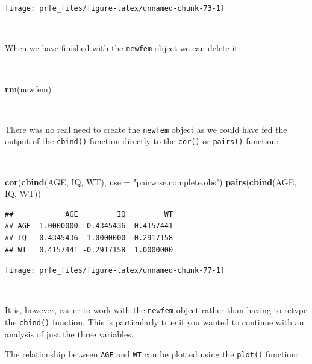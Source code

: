\documentclass[12pt,a4paper]{book}
\newenvironment{Shaded}{\begin{snugshade}}{\end{snugshade}}
\newcommand{\DataTypeTok}[1]{\textcolor[rgb]{0.13,0.29,0.53}{#1}}
\newcommand{\KeywordTok}[1]{\textcolor[rgb]{0.13,0.29,0.53}{\textbf{#1}}}
\newcommand{\NormalTok}[1]{#1}
\newcommand{\StringTok}[1]{\textcolor[rgb]{0.31,0.60,0.02}{#1}}
\theoremstyle{definition}
\theoremstyle{definition}
\theoremstyle{definition}
\theoremstyle{remark}
\begin{document}
\newpage

\begin{center}\texttt{[image: prfe\_files/figure-latex/unnamed-chunk-73-1]} \end{center}

~

When we have finished with the \texttt{newfem} object we can delete it:

~

\begin{Shaded}
\begin{Highlighting}[]
\KeywordTok{rm}\NormalTok{(newfem)}
\end{Highlighting}
\end{Shaded}

~

There was no real need to create the \texttt{newfem} object as we could
have fed the output of the \texttt{cbind()} function directly to the
\texttt{cor()} or \texttt{pairs()} function:

~

\begin{Shaded}
\begin{Highlighting}[]
\KeywordTok{cor}\NormalTok{(}\KeywordTok{cbind}\NormalTok{(AGE, IQ, WT), }\DataTypeTok{use =} \StringTok{"pairwise.complete.obs"}\NormalTok{)}
\KeywordTok{pairs}\NormalTok{(}\KeywordTok{cbind}\NormalTok{(AGE, IQ, WT))}
\end{Highlighting}
\end{Shaded}

\begin{verbatim}
##            AGE         IQ         WT
## AGE  1.0000000 -0.4345436  0.4157441
## IQ  -0.4345436  1.0000000 -0.2917158
## WT   0.4157441 -0.2917158  1.0000000
\end{verbatim}

\newpage

\begin{center}\texttt{[image: prfe\_files/figure-latex/unnamed-chunk-77-1]} \end{center}

~

It is, however, easier to work with the \texttt{newfem} object rather
than having to retype the \texttt{cbind()} function. This is
particularly true if you wanted to continue with an analysis of just the
three variables.

The relationship between \texttt{AGE} and \texttt{WT} can be plotted
using the \texttt{plot()} function:

~
\end{document}
